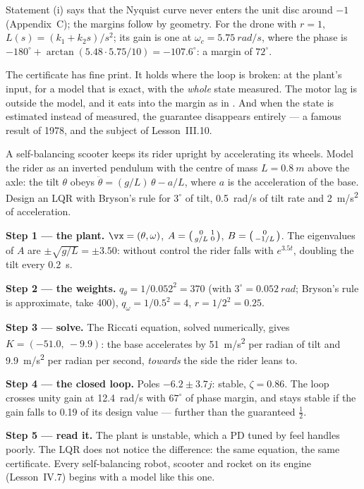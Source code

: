 Statement (i) says that the Nyquist curve never enters the unit disc around $-1$ (Appendix~C); the margins follow by geometry. For the drone with $r = 1$, $L(s) = (k_1 + k_2s)/s^2$; its gain is one at $\omega_c = \SI{5.75}{rad/s}$, where the phase is $-180^\circ + \arctan(5.48 \cdot 5.75/10) = -107.6^\circ$: a margin of $72^\circ$.

The certificate has fine print. It holds where the loop is broken: at the plant's input, for a model that is exact, with the \emph{whole} state measured. The motor lag is outside the model, and it eats into the margin as in . And when the state is estimated instead of measured, the guarantee disappears entirely — a famous result of 1978, and the subject of Lesson~III.10.

\begin{example}
\label{ex:lqr-segway}
A self-balancing scooter keeps its rider upright by accelerating its wheels. Model the rider as an inverted pendulum with the centre of mass $L = \SI{0.8}{m}$ above the axle: the tilt $\theta$ obeys $\ddot\theta = (g/L)\,\theta - a/L$, where $a$ is the acceleration of the base. Design an LQR with Bryson's rule for $3^\circ$ of tilt, \SI{0.5}{rad/s} of tilt rate and \SI{2}{m/s^2} of acceleration.

\textbf{Step 1 — the plant.} $\vx = (\theta, \omega)$, $A = \begin{psmallmatrix}0 & 1\\ g/L & 0\end{psmallmatrix}$, $B = \begin{psmallmatrix}0\\ -1/L\end{psmallmatrix}$. The eigenvalues of $A$ are $\pm\sqrt{g/L} = \pm3.50$: without control the rider falls with $e^{3.5t}$, doubling the tilt every \SI{0.2}{s}.

\textbf{Step 2 — the weights.} $q_\theta = 1/0.052^2 = 370$ (with $3^\circ = \SI{0.052}{rad}$; Bryson's rule is approximate, take 400), $q_\omega = 1/0.5^2 = 4$, $r = 1/2^2 = 0.25$.

\textbf{Step 3 — solve.} The Riccati equation, solved numerically, gives $K = (-51.0,\ -9.9)$: the base accelerates by \SI{51}{m/s^2} per radian of tilt and \SI{9.9}{m/s^2} per radian per second, \emph{towards} the side the rider leans to.

\textbf{Step 4 — the closed loop.} Poles $-6.2 \pm 3.7j$: stable, $\zeta = 0.86$. The loop crosses unity gain at \SI{12.4}{rad/s} with $67^\circ$ of phase margin, and stays stable if the gain falls to 0.19 of its design value — further than the guaranteed $\tfrac12$.

\textbf{Step 5 — read it.} The plant is unstable, which a PD tuned by feel handles poorly. The LQR does not notice the difference: the same equation, the same certificate. Every self-balancing robot, scooter and rocket on its engine (Lesson~IV.7) begins with a model like this one.
\end{example}


